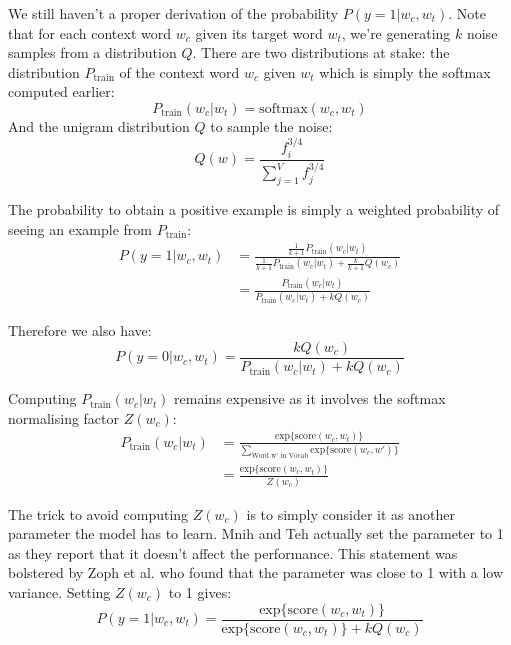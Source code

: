 We still haven't a proper derivation of the probability $P(y=1| w_c, w_t)$. Note that for each context word $w_c$ given its target word $w_t$, we're generating $k$ noise samples from a distribution $Q$. There are two distributions at stake: the distribution $P_{\text{train}}$ of the context word $w_c$ given $w_t$ which is simply the softmax computed earlier:
\begin{equation}
    P_{\text{train}}(w_c|w_t) = \text{softmax}(w_c, w_t)
\end{equation}
And the unigram distribution $Q$ to sample the noise:
\begin{equation}
    Q(w) = \frac{f_i^{3/4}}{\sum_{j=1}^V f_j^{3/4}}
\end{equation}

The probability to obtain a positive example is simply a weighted probability of seeing an example from $P_{\text{train}}$:
\begin{align}
    P(y=1| w_c, w_t) &= \frac{\frac{1}{k+1}P_{\text{train}}(w_c|w_t)}{\frac{1}{k+1}P_{\text{train}}(w_c|w_t) + \frac{k}{k+1}Q(w_c)}\nonumber \\
     &= \frac{P_{\text{train}}(w_c|w_t)}{P_{\text{train}}(w_c|w_t) + kQ(w_c)}
\end{align}

Therefore we also have:
\begin{equation}
    P(y=0| w_c, w_t) = \frac{kQ(w_c)}{P_{\text{train}}(w_c|w_t) + kQ(w_c)}
\end{equation}

Computing $P_{\text{train}}(w_c|w_t)$ remains expensive as it involves the softmax normalising factor $Z(w_c)$:
\begin{align}
    P_{\text{train}}(w_c|w_t) &= \frac{\text{exp}\{\text{score}(w_c, w_t)\}}{\sum_{\text{Word w' in Vocab}}\text{exp}\{\text{score}(w_c, w')\}} \nonumber \\
     &= \frac{\text{exp}\{\text{score}(w_c, w_t)\}}{Z(w_c)}
\end{align}

The trick to avoid computing $Z(w_c)$ is to simply consider it as another parameter the model has to learn. Mnih and Teh \cite{nce} actually set the parameter to 1 as they report that it doesn't affect the performance. This statement was bolstered by Zoph et al. \cite{nce2} who found that the parameter was close to 1 with a low variance. Setting $Z(w_c)$ to 1 gives:
\begin{equation}
    P(y=1| w_c, w_t) = \frac{\text{exp}\{\text{score}(w_c, w_t)\}}{\text{exp}\{\text{score}(w_c, w_t)\} + kQ(w_c)}
\end{equation}

